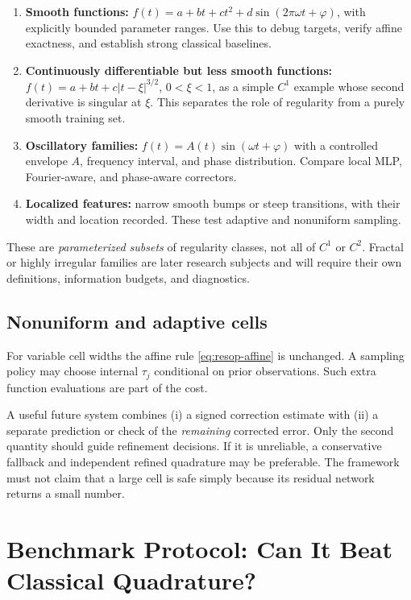 \begin{enumerate}
    \item \textbf{Smooth functions:}
          $f(t)=a+bt+ct^2+d\sin(2\pi\omega t+\varphi)$, with explicitly bounded
          parameter ranges. Use this to debug targets, verify affine exactness,
          and establish strong classical baselines.
    \item \textbf{Continuously differentiable but less smooth functions:}
          $f(t)=a+bt+c|t-\xi|^{3/2}$, $0<\xi<1$, as a simple $C^1$ example
          whose second derivative is singular at $\xi$. This separates the role
          of regularity from a purely smooth training set.
    \item \textbf{Oscillatory families:}
          $f(t)=A(t)\sin(\omega t+\varphi)$ with a controlled envelope $A$,
          frequency interval, and phase distribution. Compare local MLP,
          Fourier-aware, and phase-aware correctors.
    \item \textbf{Localized features:}
          narrow smooth bumps or steep transitions, with their width and
          location recorded. These test adaptive and nonuniform sampling.
\end{enumerate}
These are \emph{parameterized subsets} of regularity classes, not all of
$C^1$ or $C^2$. Fractal or highly irregular families are later research
subjects and will require their own definitions, information budgets,
and diagnostics.

\subsection{Nonuniform and adaptive cells}

For variable cell widths the affine rule \eqref{eq:resop-affine} is unchanged.
A sampling policy may choose internal $\tau_j$ conditional on prior
observations. Such extra function evaluations are part of the cost.

A useful future system combines (i) a signed correction estimate with
(ii) a separate prediction or check of the \emph{remaining} corrected
error. Only the second quantity should guide refinement decisions.
If it is unreliable, a conservative fallback and independent refined
quadrature may be preferable. The framework must not claim that a
large cell is safe simply because its residual network returns a small
number.

\section{Benchmark Protocol: Can It Beat Classical Quadrature?}
\label{sec:resop-benchmark}

